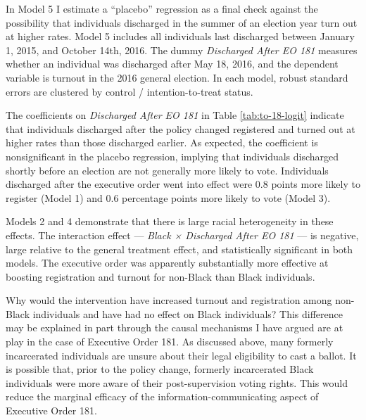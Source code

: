 \documentclass[
  12pt,
]{article}
\begin{document}
In Model 5 I estimate a ``placebo'' regression as a final check against the possibility that individuals discharged in the summer of an election year turn out at higher rates. Model 5 includes all individuals last discharged between January 1, 2015, and October 14th, 2016. The dummy \emph{Discharged After EO 181} measures whether an individual was discharged after May 18, 2016, and the dependent variable is turnout in the 2016 general election. In each model, robust standard errors are clustered by control / intention-to-treat status.

\begin{singlespace}


\end{singlespace}

The coefficients on \emph{Discharged After EO 181} in Table \ref{tab:to-18-logit} indicate that individuals discharged after the policy changed registered and turned out at higher rates than those discharged earlier. As expected, the coefficient is nonsignificant in the placebo regression, implying that individuals discharged shortly before an election are not generally more likely to vote. Individuals discharged after the executive order went into effect were 0.8 points more likely to register (Model 1) and 0.6 percentage points more likely to vote (Model 3).

Models 2 and 4 demonstrate that there is large racial heterogeneity in these effects. The interaction effect --- \emph{Black × Discharged After EO 181} --- is negative, large relative to the general treatment effect, and statistically significant in both models. The executive order was apparently substantially more effective at boosting registration and turnout for non-Black than Black individuals.

Why would the intervention have increased turnout and registration among non-Black individuals and have had no effect on Black individuals? This difference may be explained in part through the causal mechanisms I have argued are at play in the case of Executive Order 181. As discussed above, many formerly incarcerated individuals are unsure about their legal eligibility to cast a ballot. It is possible that, prior to the policy change, formerly incarcerated Black individuals were more aware of their post-supervision voting rights. This would reduce the marginal efficacy of the information-communicating aspect of Executive Order 181.
\end{document}

